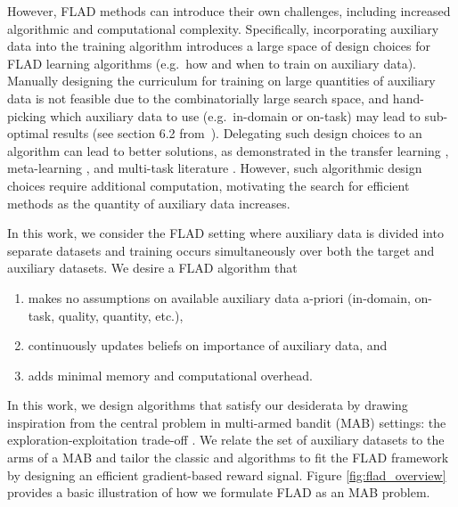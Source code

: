  
However, FLAD methods can introduce their own challenges, including increased algorithmic and computational complexity.
Specifically, incorporating auxiliary data into the training algorithm introduces a large space of design choices for FLAD learning algorithms (e.g.\ how and when to train on auxiliary data).
Manually designing the curriculum for training on large quantities of auxiliary data is not feasible due to the combinatorially large search space, and hand-picking which auxiliary data to use (e.g.\ in-domain or on-task) may lead to sub-optimal results (see section 6.2 from~\citet{feta_albalak}).
Delegating such design choices to an algorithm can lead to better solutions, as demonstrated in the transfer learning \citep{vu-etal-2020-exploring, pruksachatkun-etal-2020-intermediate}, meta-learning \citep{10.5555/296635, bansal-etal-2020-self}, and multi-task literature \citep{Wu2020Understanding, aghajanyan-etal-2021-muppet}. However, such algorithmic design choices require additional computation, motivating the search for efficient methods as the quantity of auxiliary data increases.

In this work, we consider the FLAD setting where auxiliary data is divided into separate datasets and training occurs simultaneously over both the target and auxiliary datasets. We desire a FLAD algorithm that

\begin{enumerate}[nosep]
    \item makes no assumptions on available auxiliary data a-priori (in-domain, on-task, quality, quantity, etc.),
    \item continuously updates beliefs on importance of auxiliary data, and
    \item adds minimal memory and computational overhead.
\end{enumerate}

In this work, we design algorithms that satisfy our desiderata by drawing inspiration from the central problem in multi-armed bandit (MAB) settings: the exploration-exploitation trade-off \citep{macready1998bandit, simpkins2008optimal}. We relate the set of auxiliary datasets to the arms of a MAB and tailor the classic \ex{} \citep{auer2002nonstochastic} and \ucb{} \citep{auer2002finite} algorithms to fit the FLAD framework by designing an efficient gradient-based reward signal. Figure \ref{fig:flad_overview} provides a basic illustration of how we formulate FLAD as an MAB problem.

